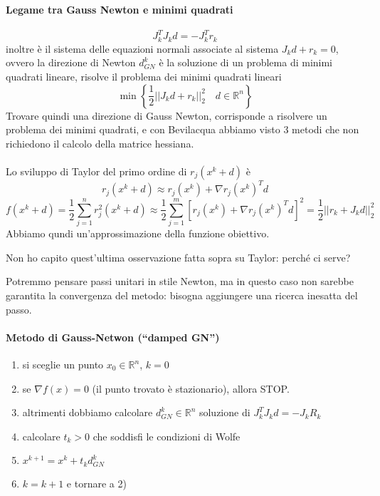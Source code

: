 \paragraph{Legame tra Gauss Newton e minimi quadrati}
$$J_{k}^{T}J_kd = - J_k^{T}r_k$$
inoltre è il sistema delle equazioni normali associate al sistema
$J_kd + r_k=0 $, ovvero la direzione di Newton $d_{GN}^{k}$ è la
soluzione di un problema di minimi quadrati lineare, risolve il
problema dei minimi quadrati lineari
$$ \min \left\{ \frac{1}{2} || J_k d + r_k ||_{2}^{2} \quad d \in \mathbb{R}^{n} \right\} $$
Trovare quindi una direzione di Gauss Newton, corrisponde
a risolvere un problema dei minimi quadrati,
e con Bevilacqua abbiamo visto 3 metodi che non richiedono
il calcolo della matrice hessiana. \\ \\
Lo sviluppo di Taylor del primo ordine di $r_j(x^{k}+ d) $ è
$$ r_j(x^{k}+ d)  \approx r_j(x^{k}) + \nabla r_j(x^{k})^{T} d$$
$$ f(x^k + d) = 
\frac{1}{2} \displaystyle \sum_{j=1}^{n} r_j^{2}(x^{k} + d) \approx
 \frac{1}{2} \displaystyle \sum_{j=1}^{m}
\left[ r_j(x^{k}) + \nabla r_j(x^{k})^{T}d\right]^{2} = 
\frac{1}{2} || r_k + J_kd ||_{2}^{2} $$
Abbiamo qundi un'approssimazione della funzione obiettivo.
\begin{openquestion}
  Non ho capito quest'ultima osservazione fatta sopra
su Taylor: perch\'e ci serve?
\end{openquestion}
Potremmo pensare passi unitari in stile Newton, ma in questo caso
non sarebbe garantita la convergenza del metodo: bisogna aggiungere
una ricerca inesatta del passo.

\paragraph{Metodo di Gauss-Netwon (``damped GN'')}
\begin{enumerate}
\item si sceglie un punto $x_0 \in \mathbb{R}^{n}$, $k=0$
\item se $\nabla f(x)=0$ (il punto trovato è stazionario),
      allora STOP.
\item altrimenti dobbiamo calcolare $d^{k}_{GN} \in \mathbb{R}^{n}$ soluzione
      di $J_{k}^{T}J_{k}d = -J_{k}R_{k}$
\item calcolare $t_k > 0 $ che soddisfi le condizioni di Wolfe
\item $x^{k+1} = x^{k} + t_k d_{GN}^{k}$
\item $k = k+1$ e tornare a 2)
\end{enumerate}

